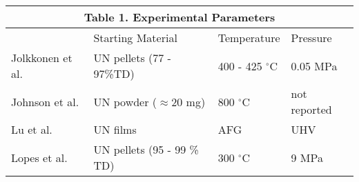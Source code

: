 \documentclass[3p,review,11pt]{elsarticle}
\begin{document}
\par 



\begin{tabular}{ |p{3cm}|p{3cm}|p{3cm}|p{3cm}|  }
	\hline
	\multicolumn{4}{|c|}{\textbf{Table 1.} Experimental Parameters} \\
	\hline
	 & Starting Material &Temperature & Pressure\\
	\hline
	Jolkkonen et al. \cite{Jolkkonen2017}   &  UN pellets (77 - 97\%TD) &400 - 425 $^{\circ}$C&  0.05 MPa \\
	Johnson et al. \cite{Johnson2016}   & UN powder ($\approx$20 mg)     &800 $^{\circ}$C&  not reported \\
	Lu et al. \cite{Lu2016}  & UN films    &AFG&   UHV \\
	Lopes et al. \cite{Lopes2017}   & UN pellets (95 - 99 \% TD)    & 300 $^{\circ}$C&   9 MPa \\
	\hline
\end{tabular}
\end{document}

